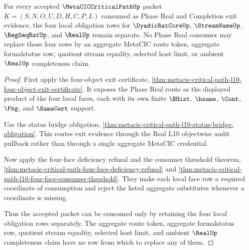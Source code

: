 \begin{theorem}
\label{thm:metacic-critical-path-l10-four-face-obligation-noncollapse}
For every accepted $\MetaCICCriticalPathUp$ packet $K=(S,N,O,U,D,H,C,P,L)$ consumed as Phase Real and Completion exit evidence, the four local obligation rows for $\DyadicRatCoreUp$, $\StreamNameUp$, $\RegSeqRatUp$, and $\RealUp$ remain separate. No Phase Real consumer may replace those four rows by an aggregate MetaCIC route token, aggregate formalstatus row, quotient stream equality, selected host limit, or ambient $\RealUp$ completeness claim.
\end{theorem}
\begin{proof}
First apply the four-object exit certificate, \autoref{thm:metacic-critical-path-l10-four-object-exit-certificate}. It exposes the Phase Real route as the displayed product of the four local faces, each with its own finite $\BHist$, $\hsame$, $\Cont$, $\Pkg$, and $\NameCert$ support.

Use the status bridge obligation, \autoref{thm:metacic-critical-path-l10-status-bridge-obligation}. This routes exit evidence through the Real L10 objectwise audit pullback rather than through a single aggregate MetaCIC credential.

Now apply the four-face deficiency refusal and the consumer threshold theorem, \autoref{thm:metacic-critical-path-four-face-deficiency-refusal} and \autoref{thm:metacic-critical-path-l10-four-face-consumer-threshold}. They make each local face row a required coordinate of consumption and reject the listed aggregate substitutes whenever a coordinate is missing.

Thus the accepted packet can be consumed only by retaining the four local obligation rows separately. The aggregate route token, aggregate formalstatus row, quotient stream equality, selected host limit, and ambient $\RealUp$ completeness claim have no row from which to replace any of them.
\end{proof}

